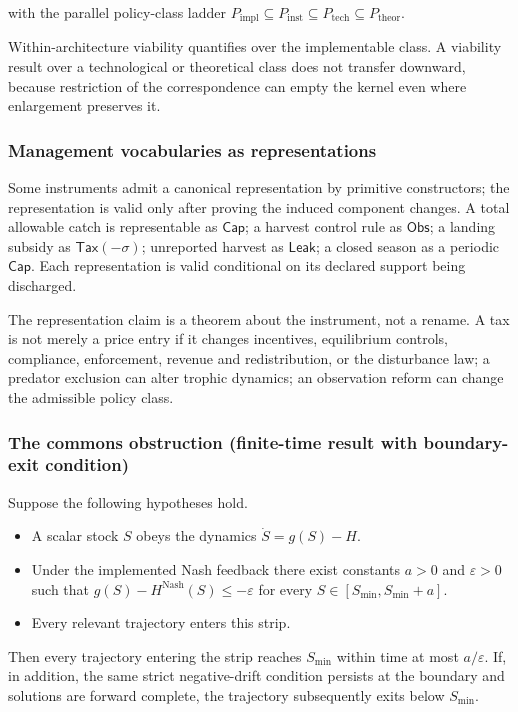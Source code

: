 with the parallel policy-class ladder $P_{\mathrm{impl}} \subseteq P_{\mathrm{inst}} \subseteq P_{\mathrm{tech}} \subseteq P_{\mathrm{theor}}$.

Within-architecture viability quantifies over the implementable class. A viability result over a technological or theoretical class does not transfer downward, because restriction of the correspondence can empty the kernel even where enlargement preserves it.

\subsubsection{Management vocabularies as representations}

Some instruments admit a canonical representation by primitive constructors; the representation is valid only after proving the induced component changes. A total allowable catch is representable as $\mathsf{Cap}$; a harvest control rule as $\mathsf{Obs}$; a landing subsidy as $\mathsf{Tax}(-\sigma)$; unreported harvest as $\mathsf{Leak}$; a closed season as a periodic $\mathsf{Cap}$. Each representation is valid conditional on its declared support being discharged.

The representation claim is a theorem about the instrument, not a rename. A tax is not merely a price entry if it changes incentives, equilibrium controls, compliance, enforcement, revenue and redistribution, or the disturbance law; a predator exclusion can alter trophic dynamics; an observation reform can change the admissible policy class.

\subsubsection{The commons obstruction (finite-time result with boundary-exit condition)}

\begin{theorem}\label{thm:si:commons}
Suppose the following hypotheses hold.
\begin{itemize}[leftmargin=3em]
\item[(H1)] A scalar stock $S$ obeys the dynamics $\dot S = g(S) - H$.
\item[(H2)] Under the implemented Nash feedback there exist constants $a > 0$ and $\varepsilon > 0$ such that
$g(S) - H^{\mathrm{Nash}}(S) \le -\varepsilon$ for every $S \in [S_{\min}, S_{\min} + a]$.
\item[(H3)] Every relevant trajectory enters this strip.
\end{itemize}
Then every trajectory entering the strip reaches $S_{\min}$ within time at most $a/\varepsilon$. If, in addition, the same strict negative-drift condition persists at the boundary and solutions are forward complete, the trajectory subsequently exits below $S_{\min}$.
\end{theorem}

